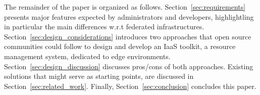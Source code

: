 The remainder of the paper is organized as
follows. Section~\ref{sec:requirements} presents major features
expected by administrators and developers, highlightling in particular
the main differences w.r.t federated infrastructures.
Section~\ref{sec:design_considerations} introduces two approaches that
open source communities could follow to design and develop an IaaS
toolkit, \aka a resource management system, dedicated to edge
environments. Section~\ref{sec:design_discussion} discusses pros/cons
of both approaches. Existing solutions that might serve as starting
points, are discussed in Section~\ref{sec:related_work}. Finally,
Section~\ref{sec:conclusion} concludes this paper.



